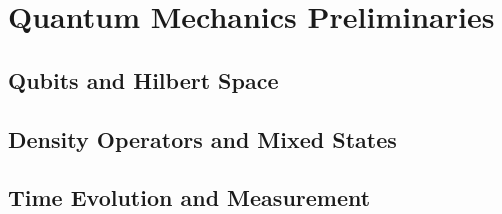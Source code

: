 \chapter{Quantum Mechanics Preliminaries}
\section{Qubits and Hilbert Space}
\section{Density Operators and Mixed States}
\section{Time Evolution and Measurement}


